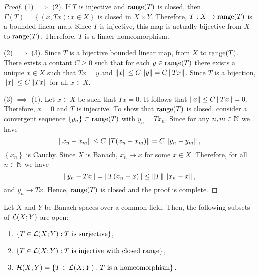 \documentclass[a4paper]{article}
\begin{document}
\begin{proof}
  (1) $\implies$ (2). If $T$ is injective and $\operatorname{range}(T)$ is closed,
  then $\Gamma(T) = \left\{ (x, Tx) : x \in X \right\}$ is closed in 
  $X \times Y$. Therefore, $T : X \to \operatorname{range} (T)$ is a bounded linear 
  map. Since $T$ is injective, this map is actually bijective from 
  $X$ to $\operatorname{range} (T)$. Therefore, $T$ is a linaer homeomorphism. 

  (2) $\implies$ (3). Since $T$ is a bijective bounded linear map,
  from $X$ to $\operatorname{range}(T)$. There exists a contant $C \geq 0$
  such that for each $y \in \operatorname{range}(T)$ there exists 
  a unique $x \in X$ such that $T x = y$ and $\left\lVert x\right\rVert \leq
  C \left\lVert y\right\rVert = C \left\lVert T x\right\rVert$. Since $T$ is a bijection, 
  $\left\lVert x\right\rVert \leq C \left\lVert T x\right\rVert$ for all $x \in X$. 

  (3) $\implies$ (1). Let $x \in X$ be such that $T x = 0$.
  It follows that $\left\lVert x\right\rVert \leq C \left\lVert T x\right\rVert = 0$. Therefore, 
  $x = 0$ and $T$ is injective. To show that 
  $\operatorname{range}(T)$ is closed, consider a convergent sequence 
  $\left\{ y_n \right\} \subset \operatorname{range}(T)$ with 
  $y_n = T x_n$. Since for any $n, m \in \mathbb{N}$ we have 
  \[
  \left\lVert x_n - x_m\right\rVert \leq C \left\lVert T (x_n - x_m)\right\rVert = C \left\lVert y_n - y_m\right\rVert,
  \]
  $\left\{ x_n \right\}$ is Cauchy. Since $X$ is Banach, 
  $x_n \to x$ for some $x \in X$. Therefore, for 
  all $n \in \mathbb{N}$ we have
  \[
  \left\lVert y_n - T x\right\rVert = \left\lVert T (x_n - x)\right\rVert \leq \left\lVert T\right\rVert \left\lVert x_n - x\right\rVert,
  \]
  and $y_n \to T x$. Hence, $\operatorname{range}(T)$ is closed and the proof is
  complete.
\end{proof}

\begin{thm}
  Let $X$ and $Y$ be Banach spaces over a common field. 
  Then, the following subsets of $\mathcal{L}(X; Y)$ are open:
  \begin{enumerate}
    \item $\left\{ T \in \mathcal{L}(X; Y) : \text{$T$ is surjective} \right\}$,
    \item $\left\{ T \in \mathcal{L}(X; Y) : \text{$T$ is injective with closed range} \right\}$,
    \item $\mathcal{H}(X; Y) = \left\{ T \in \mathcal{L}(X; Y) : \text{$T$ is a homeomorphism} \right\}$.
  \end{enumerate}
\end{thm}
\end{document}
